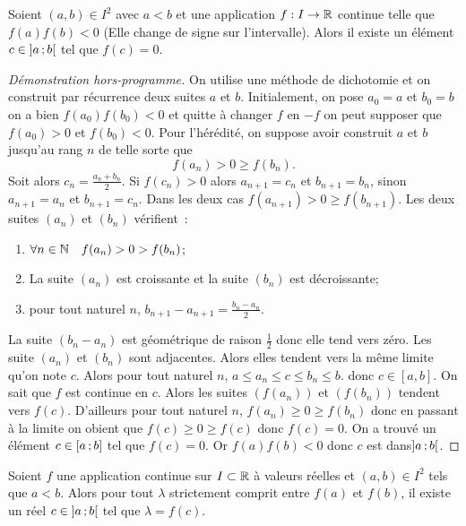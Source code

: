 \begin{theo}
  Soient $(a,b) \in I^2$ avec $a<b$ et une application $f:I\rightarrow \mathbb{R}$ continue telle que $f(a) f(b) < 0$ (Elle change de signe sur l'intervalle). Alors il existe un élément $c \in \left] a \, ;  b \right[$ tel que $f(c)=0$.
\end{theo}
\begin{proof}[Démonstration hors-programme]
  On utilise une méthode de dichotomie et on construit par récurrence deux suites $a$ et $b$. Initialement, on pose $a_0=a$ et $b_0=b$ on a bien $f(a_0)f(b_0) < 0$ et quitte à changer $f$ en $-f$ on peut supposer que $f(a_0)>0$ et $f(b_0)<0$. Pour l'hérédité, on suppose avoir construit $a$ et $b$ jusqu'au rang $n$ de telle sorte que
\begin{equation}
  f(a_n) > 0 \geq f(b_n).
\end{equation}
Soit alors $c_n=\frac{a_n+b_n}{2}$. Si $f(c_n) >0$ alors $a_{n+1}=c_n$ et $b_{n+1}=b_n$, sinon $a_{n+1}=a_n$ et $b_{n+1}=c_n$. Dans les deux cas $f(a_{n+1})> 0 \geq f(b_{n+1})$. Les deux suites $(a_n)$ et $(b_n)$ vérifient~:
\begin{enumerate}
\item $\forall n \in \mathbb{N} \quad f(a_n) > 0 > f(b_n)$;
\item La suite $(a_n)$ est croissante et la suite $(b_n)$ est décroissante;
\item pour tout naturel $n$, $b_{n+1}-a_{n+1}=\frac{b_n -a_n}{2}$. 
\end{enumerate}
La suite $(b_n-a_n)$ est géométrique de raison $\frac{1}{2}$ donc elle tend vers zéro. Les suite $(a_n)$ et $(b_n)$ sont adjacentes. Alors elles tendent vers la même limite qu'on note $c$. Alors pour tout naturel $n$, $a\leq a_n \leq c \leq b_n \leq b$. donc $c \in [a,b]$. On sait que $f$ est  continue en $c$. Alors les suites $(f(a_n))$ et $(f(b_n))$ tendent vers $f(c)$. D'ailleurs pour tout naturel $n$, $f(a_n) \geq 0 \geq f(b_n)$ donc en passant à la limite on obient que $f(c) \geq 0 \geq f(c)$ donc $f(c)=0$. On a trouvé un élément $c \in \left[ a \, ;  b \right]$ tel que $f(c)=0$. Or $f(a)f(b) < 0$ donc $c$ est dans$\left] a \, ;  b \right[$.
\end{proof}
\begin{cor}
  Soient $f$ une application continue sur $I \subset \mathbb{R}$ à valeurs réelles et $(a,b) \in I^2$ tels que $a < b$. Alors pour tout $\lambda$ strictement comprit entre $f(a)$ et $f(b)$, il existe un réel $c \in \left] a \, ;  b \right[$ tel que $\lambda =f(c)$.
\end{cor}
